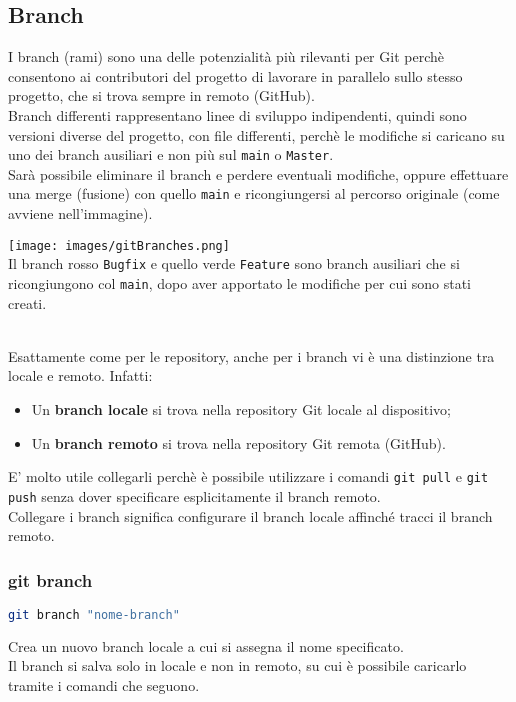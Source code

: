 \newpage
\subsection{Branch}

\begin{minipage}{.46\textwidth}
	I branch (rami) sono una delle potenzialità più rilevanti per Git perchè consentono ai contributori del progetto di lavorare in parallelo sullo stesso progetto, che si trova sempre in remoto (GitHub).\\
	Branch differenti rappresentano linee di sviluppo indipendenti, quindi sono versioni diverse del progetto, con file differenti, perchè le modifiche si caricano su uno dei branch ausiliari e non più sul \texttt{main} o \texttt{Master}.\\
	Sarà possibile eliminare il branch e perdere eventuali modifiche, oppure effettuare una merge (fusione) con quello \texttt{main} e ricongiungersi al percorso originale (come avviene nell'immagine).
\end{minipage}
\hfil
\begin{minipage}{.46\textwidth}
	\texttt{[image: images/gitBranches.png]}\vspace{.3cm}\\
	\label{fig:branches}
	Il branch rosso \texttt{Bugfix} e quello verde \texttt{Feature} sono branch ausiliari che si ricongiungono col \texttt{main}, dopo aver apportato le modifiche per cui sono stati creati.
\end{minipage}
\vspace{.3cm}\\
Esattamente come per le repository, anche per i branch vi è una distinzione tra locale e remoto. Infatti:
\begin{itemize}[noitemsep, topsep=3pt]
	\item Un \textbf{branch locale} si trova nella repository Git locale al dispositivo;
	\item Un \textbf{branch remoto} si trova nella repository Git remota (GitHub).
\end{itemize}
E' molto utile collegarli perchè è possibile utilizzare i comandi \texttt{git pull} e \texttt{git push} senza dover specificare esplicitamente il branch remoto.\\
Collegare i branch significa configurare il branch locale affinché tracci il branch remoto.

\subsubsection{git branch}
\begin{lstlisting}[language=bash]
	git branch "nome-branch"
\end{lstlisting}
Crea un nuovo branch locale a cui si assegna il nome specificato.\\
Il branch si salva solo in locale e non in remoto, su cui è possibile caricarlo tramite i comandi che seguono.\\

